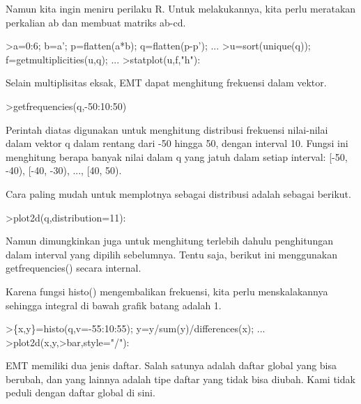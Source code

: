 \documentclass[a4paper,10pt]{article}
\begin{document}
\begin{eulernotebook}
\begin{eulercomment}
\begin{eulercomment}
\begin{eulercomment}
\begin{eulercomment}
\begin{eulercomment}
\begin{eulercomment}
\begin{eulercomment}
\begin{eulercomment}
\begin{eulercomment}
\begin{eulercomment}
\begin{eulercomment}
\begin{eulercomment}
\begin{eulercomment}
Namun kita ingin meniru perilaku R. Untuk melakukannya, kita perlu
meratakan perkalian ab dan membuat matriks ab-cd.
\end{eulercomment}
\begin{eulerprompt}
>a=0:6; b=a'; p=flatten(a*b); q=flatten(p-p'); ...
>u=sort(unique(q)); f=getmultiplicities(u,q); ...
>statplot(u,f,"h"):
\end{eulerprompt}
\begin{eulercomment}
Selain multiplisitas eksak, EMT dapat menghitung frekuensi dalam
vektor.
\end{eulercomment}
\begin{eulerprompt}
>getfrequencies(q,-50:10:50)
\end{eulerprompt}
\begin{euleroutput}
  [0,  23,  132,  316,  602,  801,  333,  141,  53,  0]
\end{euleroutput}
\begin{eulercomment}
Perintah diatas digunakan untuk menghitung distribusi frekuensi
nilai-nilai dalam vektor q dalam rentang dari -50 hingga 50, dengan
interval 10. Fungsi ini menghitung berapa banyak nilai dalam q yang
jatuh dalam setiap interval: [-50, -40), [-40, -30), ..., [40, 50).

Cara paling mudah untuk memplotnya sebagai distribusi adalah sebagai
berikut.
\end{eulercomment}
\begin{eulerprompt}
>plot2d(q,distribution=11):
\end{eulerprompt}
\begin{eulercomment}
Namun dimungkinkan juga untuk menghitung terlebih dahulu penghitungan
dalam interval yang dipilih sebelumnya. Tentu saja, berikut ini
menggunakan getfrequencies() secara internal.

Karena fungsi histo() mengembalikan frekuensi, kita perlu
menskalakannya sehingga integral di bawah grafik batang adalah 1.
\end{eulercomment}
\begin{eulerprompt}
>\{x,y\}=histo(q,v=-55:10:55); y=y/sum(y)/differences(x); ...
>plot2d(x,y,>bar,style="/"):
\end{eulerprompt}
\begin{eulercomment}
\begin{eulercomment}
\begin{eulercomment}
EMT memiliki dua jenis daftar. Salah satunya adalah daftar global yang
bisa berubah, dan yang lainnya adalah tipe daftar yang tidak bisa
diubah. Kami tidak peduli dengan daftar global di sini.


\end{eulercomment}
\end{eulercomment}
\end{eulercomment}
\end{eulercomment}
\end{eulercomment}
\end{eulercomment}
\end{eulercomment}
\end{eulercomment}
\end{eulercomment}
\end{eulercomment}
\end{eulercomment}
\end{eulercomment}
\end{eulercomment}
\end{eulercomment}
\end{eulercomment}
\end{eulernotebook}
\end{document}
